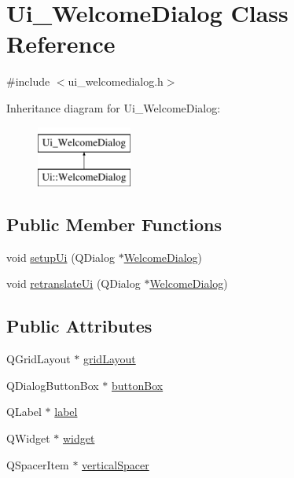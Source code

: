 \hypertarget{class_ui___welcome_dialog}{}\section{Ui\+\_\+\+Welcome\+Dialog Class Reference}
\label{class_ui___welcome_dialog}


{\ttfamily \#include $<$ui\+\_\+welcomedialog.\+h$>$}

Inheritance diagram for Ui\+\_\+\+Welcome\+Dialog\+:\begin{figure}[H]
\begin{center}
\leavevmode
\includegraphics[height=2.000000cm]{class_ui___welcome_dialog}
\end{center}
\end{figure}
\subsection*{Public Member Functions}
\begin{DoxyCompactItemize}
\item 
void \hyperlink{class_ui___welcome_dialog_a423d87674cd389d9780493c4e69d3d9a}{setup\+Ui} (Q\+Dialog $\ast$\hyperlink{class_welcome_dialog}{Welcome\+Dialog})
\item 
void \hyperlink{class_ui___welcome_dialog_a6a7b7092cef38c1fe68a40809e4caeb0}{retranslate\+Ui} (Q\+Dialog $\ast$\hyperlink{class_welcome_dialog}{Welcome\+Dialog})
\end{DoxyCompactItemize}
\subsection*{Public Attributes}
\begin{DoxyCompactItemize}
\item 
Q\+Grid\+Layout $\ast$ \hyperlink{class_ui___welcome_dialog_ad7da50ea9c67116aa89f5b4e31d10724}{grid\+Layout}
\item 
Q\+Dialog\+Button\+Box $\ast$ \hyperlink{class_ui___welcome_dialog_a6f6ead35c5b555fb6daa786b336c7257}{button\+Box}
\item 
Q\+Label $\ast$ \hyperlink{class_ui___welcome_dialog_a26c3765f036a65966735849dfb9debfd}{label}
\item 
Q\+Widget $\ast$ \hyperlink{class_ui___welcome_dialog_a1f3c7de8c4595581eaa129e8d0642d2e}{widget}
\item 
Q\+Spacer\+Item $\ast$ \hyperlink{class_ui___welcome_dialog_a5d8f10bc52bc95ae0f9fdb0f40dd8242}{vertical\+Spacer}
\end{DoxyCompactItemize}


